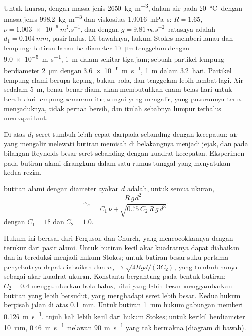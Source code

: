 Untuk kuarsa, dengan massa jenis \qty{2650}{kg.m^{-3}}, dalam air pada \qty{20}{\celsius},
dengan massa jenis \qty{998.2}{kg.m^{-3}} dan viskositas \qty{1.0016}{mPa.s}: $R =
1.65$, $\nu = \qty{1.003e-6}{m^2.s^{-1}}$, dan dengan $g =
\qty{9.81}{m.s^{-2}}$ batasnya adalah $d_1 = \qty{0.104}{mm}$, pasir halus. Di bawahnya, hukum Stokes memberi  lanau dan lempung: butiran lanau
berdiameter \qty{10}{\micro m} tenggelam dengan \qty{9.0e-5}{m.s^{-1}}, \qty{1}{m} dalam sekitar tiga jam;
sebuah partikel lempung berdiameter \qty{2}{\micro m} dengan
\qty{3.6e-6}{m.s^{-1}}, \qty{1}{m} dalam \num{3.2}~hari. Partikel lempung alami berupa
keping, bukan bola, dan tenggelam lebih lambat lagi. Air sedalam \qty{5}{m}, benar-benar diam, akan membutuhkan enam belas hari untuk bersih dari lempung semacam itu; sungai yang mengalir, yang pusarannya terus mengaduknya, tidak pernah bersih, dan itulah sebabnya lumpur terhalus mencapai laut.

Di atas $d_1$ seret tumbuh lebih cepat daripada sebanding dengan kecepatan: air yang mengalir melewati butiran memisah di belakangnya menjadi jejak, dan pada bilangan Reynolds besar seret sebanding dengan kuadrat kecepatan. Eksperimen pada butiran alami dirangkum dalam satu rumus tunggal yang menyatukan kedua rezim.

\begin{proposition}\label{prop:b1:erosion-transport:combined}
 butiran alami dengan diameter ayakan $d$ adalah, untuk semua
ukuran,
\[
  w_s = \frac{R\,g\,d^2}{C_1\,\nu + \sqrt{0.75\,C_2\,R\,g\,d^3}},
\]
dengan $C_1 = 18$ dan $C_2 = 1.0$.
\end{proposition}
\admitted

Hukum ini berasal dari Ferguson dan Church, yang mencocokkannya dengan  terukur dari pasir alami. Untuk butiran kecil akar kuadratnya dapat diabaikan dan ia tereduksi menjadi hukum Stokes; untuk butiran besar suku pertama penyebutnya dapat diabaikan dan $w_s \to \sqrt{4 R g d/(3 C_2)}$, yang tumbuh hanya sebagai akar kuadrat ukuran. Konstanta bergantung pada bentuk butiran: $C_2 = 0.4$ menggambarkan bola halus, nilai yang lebih besar menggambarkan butiran yang lebih bersudut, yang menghadapi seret lebih besar. Kedua hukum berpisah jalan di atas \qty{0.1}{mm}. Untuk butiran \qty{1}{mm} hukum gabungan memberi \qty{0.126}{m.s^{-1}}, tujuh kali lebih kecil dari hukum Stokes; untuk kerikil berdiameter \qty{10}{mm}, \qty{0.46}{m.s^{-1}} melawan \qty{90}{m.s^{-1}} yang tak bermakna (diagram di bawah).

